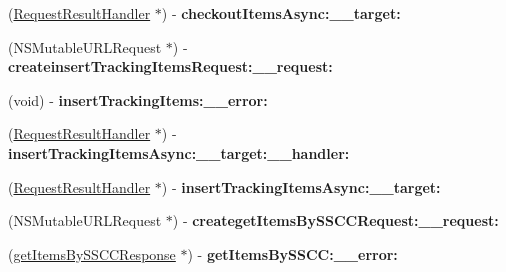 \begin{DoxyCompactItemize}
\item 
\hypertarget{interface_supply_chain_service_port_binding_a32611ae21e0c9ec9e50bfaf31b54fae3}{}(\hyperlink{interface_request_result_handler}{Request\+Result\+Handler} $\ast$) -\/ {\bfseries checkout\+Items\+Async\+:\+\_\+\+\_\+target\+:}\label{interface_supply_chain_service_port_binding_a32611ae21e0c9ec9e50bfaf31b54fae3}

\item 
\hypertarget{interface_supply_chain_service_port_binding_a21103616bf6f1c8fce3e51f2c0e8e849}{}(N\+S\+Mutable\+U\+R\+L\+Request $\ast$) -\/ {\bfseries createinsert\+Tracking\+Items\+Request\+:\+\_\+\+\_\+request\+:}\label{interface_supply_chain_service_port_binding_a21103616bf6f1c8fce3e51f2c0e8e849}

\item 
\hypertarget{interface_supply_chain_service_port_binding_a6eab4d4468cc1af96f8c27b2762b3b4d}{}(void) -\/ {\bfseries insert\+Tracking\+Items\+:\+\_\+\+\_\+error\+:}\label{interface_supply_chain_service_port_binding_a6eab4d4468cc1af96f8c27b2762b3b4d}

\item 
\hypertarget{interface_supply_chain_service_port_binding_ad7048e734cc4962b820107b047bffb16}{}(\hyperlink{interface_request_result_handler}{Request\+Result\+Handler} $\ast$) -\/ {\bfseries insert\+Tracking\+Items\+Async\+:\+\_\+\+\_\+target\+:\+\_\+\+\_\+handler\+:}\label{interface_supply_chain_service_port_binding_ad7048e734cc4962b820107b047bffb16}

\item 
\hypertarget{interface_supply_chain_service_port_binding_a745c7fde85a49d6f6652ea3f5751bc9a}{}(\hyperlink{interface_request_result_handler}{Request\+Result\+Handler} $\ast$) -\/ {\bfseries insert\+Tracking\+Items\+Async\+:\+\_\+\+\_\+target\+:}\label{interface_supply_chain_service_port_binding_a745c7fde85a49d6f6652ea3f5751bc9a}

\item 
\hypertarget{interface_supply_chain_service_port_binding_a53e8cad8781e7aa57f579599e5dd53b4}{}(N\+S\+Mutable\+U\+R\+L\+Request $\ast$) -\/ {\bfseries createget\+Items\+By\+S\+S\+C\+C\+Request\+:\+\_\+\+\_\+request\+:}\label{interface_supply_chain_service_port_binding_a53e8cad8781e7aa57f579599e5dd53b4}

\item 
\hypertarget{interface_supply_chain_service_port_binding_ab7bff6717e096782a891d87192ad8d67}{}(\hyperlink{interfaceget_items_by_s_s_c_c_response}{get\+Items\+By\+S\+S\+C\+C\+Response} $\ast$) -\/ {\bfseries get\+Items\+By\+S\+S\+C\+C\+:\+\_\+\+\_\+error\+:}\label{interface_supply_chain_service_port_binding_ab7bff6717e096782a891d87192ad8d67}


\end{DoxyCompactItemize}
